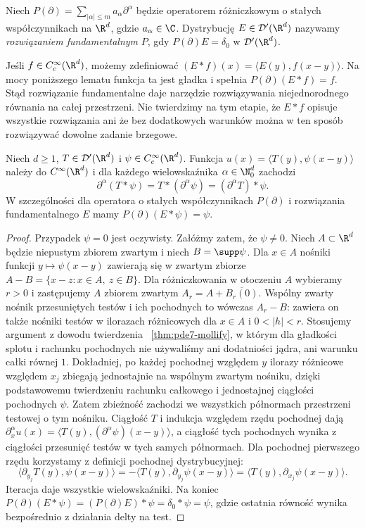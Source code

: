 \begin{definicja}
Niech $P(\partial)=\sum_{|\alpha|\le m}a_\alpha\partial^\alpha$
będzie operatorem różniczkowym o stałych współczynnikach
na $\R^d$, gdzie $a_\alpha\in\C$.
Dystrybucję $E\in\mathcal D'(\R^d)$ nazywamy
\emph{rozwiązaniem fundamentalnym} $P$, gdy
$P(\partial)E=\delta_0$ w $\mathcal D'(\R^d)$.
\end{definicja}

Jeśli $f\in C_c^\infty(\R^d)$, możemy zdefiniować
$(E*f)(x)=\langle E(y),f(x-y)\rangle$.
Na mocy poniższego lematu funkcja ta jest gładka
i spełnia $P(\partial)(E*f)=f$.
Stąd rozwiązanie fundamentalne daje narzędzie rozwiązywania
niejednorodnego równania na całej przestrzeni.
Nie twierdzimy na tym etapie, że $E*f$ opisuje wszystkie
rozwiązania ani że bez dodatkowych warunków można w ten sposób
rozwiązywać dowolne zadanie brzegowe.


\begin{lemat}
\label{lem:pde7-convolution-derivatives}
Niech $d\ge1$, $T\in\mathcal D'(\R^d)$ i
$\psi\in C_c^\infty(\R^d)$. Funkcja
$u(x)=\langle T(y),\psi(x-y)\rangle$ należy do
$C^\infty(\R^d)$ i dla każdego wielowskaźnika
$\alpha\in\N_0^d$ zachodzi
\[
 \partial^\alpha(T*\psi)
 =T*(\partial^\alpha\psi)=(\partial^\alpha T)*\psi.
\]
W szczególności dla operatora o stałych współczynnikach
$P(\partial)$ i rozwiązania fundamentalnego $E$ mamy
$P(\partial)(E*\psi)=\psi$.
\end{lemat}
\begin{proof}
Przypadek $\psi=0$ jest oczywisty. Załóżmy zatem,
że $\psi\ne0$. Niech $A\subset\R^d$ będzie
niepustym zbiorem zwartym i niech $B=\supp\psi$. Dla $x\in A$ nośniki
funkcji $y\mapsto\psi(x-y)$ zawierają się w zwartym
zbiorze $A-B=\{x-z:x\in A,\ z\in B\}$.
Dla różniczkowania w otoczeniu $A$ wybieramy
$r>0$ i zastępujemy $A$ zbiorem zwartym
$A_r=A+\overline{B_r(0)}$.
Wspólny zwarty nośnik przesuniętych testów
i ich pochodnych to wówczas $A_r-B$:
zawiera on także nośniki testów w ilorazach
różnicowych dla $x\in A$ i $0<|h|<r$.
Stosujemy argument z dowodu twierdzenia
~\ref{thm:pde7-mollify}, w którym dla gładkości
splotu i rachunku pochodnych nie używaliśmy
ani dodatniości jądra, ani warunku całki równej $1$.
Dokładniej, po każdej pochodnej względem $y$
ilorazy różnicowe względem $x_j$ zbiegają
jednostajnie na wspólnym zwartym nośniku, dzięki
podstawowemu twierdzeniu rachunku całkowego
i jednostajnej ciągłości pochodnych $\psi$.
Zatem zbieżność zachodzi we wszystkich półnormach
przestrzeni testowej o tym nośniku.
Ciągłość $T$ i indukcja względem rzędu pochodnej dają
$\partial_x^\alpha u(x)=\langle T(y),
(\partial^\alpha\psi)(x-y)\rangle$,
a ciągłość tych pochodnych wynika z ciągłości
przesunięć testów w tych samych półnormach.
Dla pochodnej pierwszego rzędu korzystamy z definicji
pochodnej dystrybucyjnej:
\[
 \langle\partial_{y_j}T(y),\psi(x-y)\rangle
 =-\langle T(y),\partial_{y_j}\psi(x-y)\rangle
 =\langle T(y),\partial_{x_j}\psi(x-y)\rangle.
\]
Iteracja daje wszystkie wielowskaźniki. Na koniec
$P(\partial)(E*\psi)=(P(\partial)E)*\psi
=\delta_0*\psi=\psi$, gdzie ostatnia równość
wynika bezpośrednio z działania delty na test.
\end{proof}

